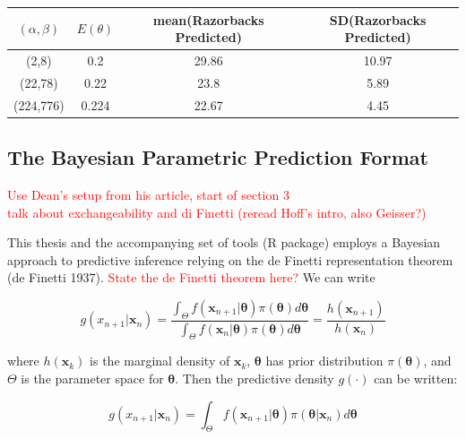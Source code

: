 \documentclass[12pt, a4paper]{article}
\begin{document}
\begin{center}
  \begin{tabular}{ |c|c|c|c| }
     \hline
     $(\alpha,\beta)$ & $E(\theta)$ & mean(Razorbacks Predicted) & SD(Razorbacks Predicted) \\
     \hline
     (2,8) & 0.2 & 29.86 & 10.97 \\
     \hline
     (22,78) & 0.22 & 23.8 & 5.89 \\
     \hline
     (224,776) & 0.224 & 22.67 & 4.45 \\
     \hline
  \end{tabular}
\end{center}


  \subsection{The Bayesian Parametric Prediction Format}

  \textcolor{red}{Use Dean's setup from his article, start of section 3}\\
  \textcolor{red}{talk about exchangeability and di Finetti (reread Hoff's intro, also Geisser?)}

  This thesis and the accompanying set of tools (R package) employs a Bayesian approach to predictive inference relying on the de Finetti representation theorem (de Finetti 1937). \textcolor{red}{State the de Finetti theorem here?} We can write

\begin{equation}
  g(x_{n+1}|\mathbf{x}_n) = \frac{\int_\Theta f(\mathbf{x}_{n+1}|\boldsymbol\theta)\pi(\boldsymbol\theta)d\boldsymbol\theta}{\int_\Theta f(\mathbf{x}_n|\boldsymbol\theta)\pi(\boldsymbol\theta)d\boldsymbol\theta} = \frac{h(\mathbf{x}_{n+1})}{h(\mathbf{x}_n)} \label{generalPredictiveDistributionFormula}
\end{equation}

\noindent where $h(\mathbf{x}_k)$ is the marginal density of $\mathbf{x}_k$, $\boldsymbol\theta$ has prior distribution $\pi(\boldsymbol\theta)$, and $\Theta$ is the parameter space for $\boldsymbol\theta$.  Then the predictive density $g(\cdot)$ can be written:

\begin{equation}
  g(x_{n+1}|\mathbf{x}_n) = \int_\Theta f(\mathbf{x}_{n+1}|\boldsymbol\theta)\pi(\boldsymbol\theta | \mathbf{x}_n)d\boldsymbol\theta \label{concisePredictiveDistributionFormula}
\end{equation}
\end{document}
